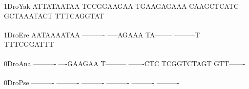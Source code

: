 \documentclass[11pt,twoside,reqno,a4paper]{article}
\begin{document}
{1\hspace*{3\charwidth}DroYak	ATTATAATAA	TCCGGAAGAA	TGAAGAGAAA	CAAGCTCATC	GCTAAATACT	TTTCAGGTAT	\\
\hspace*{4\charwidth}\hspace*{7\charwidth}\hspace*{1\charwidth}\hspace*{1\charwidth}\hspace*{1\charwidth}\hspace*{1\charwidth}\hspace*{1\charwidth}\hspace*{1\charwidth}\\
1\hspace*{3\charwidth}DroEre	AATAAAATAA	----------	-----AGAAA	TA--------	---------T	TTTCGGATTT	\\
\hspace*{4\charwidth}\hspace*{7\charwidth}\hspace*{1\charwidth}\hspace*{1\charwidth}\hspace*{1\charwidth}\hspace*{1\charwidth}\hspace*{1\charwidth}\hspace*{1\charwidth}\\
0\hspace*{3\charwidth}DroAna	----------	----GAAGAA	T---------	-------CTC	TCGGTCTAGT	GTT-------	\\
\hspace*{4\charwidth}\hspace*{7\charwidth}\hspace*{1\charwidth}\hspace*{1\charwidth}\hspace*{1\charwidth}\hspace*{1\charwidth}\hspace*{1\charwidth}\hspace*{1\charwidth}\\
0\hspace*{3\charwidth}DroPse	----------	----------	----------	----------	----------	----------	\\
\hspace*{4\charwidth}\hspace*{7\charwidth}\hspace*{1\charwidth}\hspace*{1\charwidth}\hspace*{1\charwidth}\hspace*{1\charwidth}\hspace*{1\charwidth}\hspace*{1\charwidth}\\
}
\end{document}
